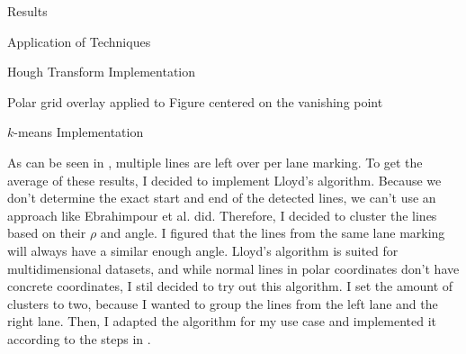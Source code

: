 \documentclass{matthijs}
\begin{document}
\begin{hoofdstuk}{Results}
\begin{paragraaf}{Application of Techniques}
\begin{subparagraaf}{Hough Transform Implementation}
\begin{figuur}{Polar grid overlay applied to Figure  centered on the vanishing point}

				\end{figuur}

			\end{subparagraaf}

			\begin{subparagraaf}{$k$-means Implementation}

				As can be seen in , multiple lines are left over per lane marking.
				To get the average of these results, I decided to implement Lloyd's algorithm.
				Because we don't determine the exact start and end of the detected lines, we can't use an approach like Ebrahimpour et al. \cite{ebrahimpour2012vanishing} did.
				Therefore, I decided to cluster the lines based on their $\rho$ and angle.
				I figured that the lines from the same lane marking will always have a similar enough angle.
				Lloyd's algorithm is suited for multidimensional datasets, and while normal lines in polar coordinates don't have concrete coordinates, I stil decided to try out this algorithm.
				I set the amount of clusters to two, because I wanted to group the lines from the left lane and the right lane.
				Then, I adapted the algorithm for my use case and implemented it according to the steps in .
				

\end{subparagraaf}
\end{paragraaf}
\end{hoofdstuk}
\end{document}
